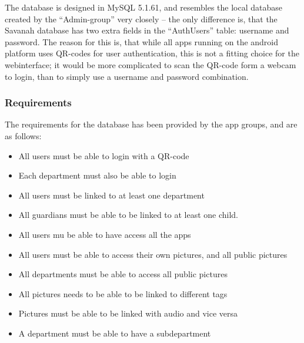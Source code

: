 The database is designed in MySQL 5.1.61, and resembles the local database created by the ``Admin-group'' very closely -- the only difference is, that the Savanah database has two extra fields in the ``AuthUsers'' table: username and password. The reason for this is, that while all apps running on the android platform uses QR-codes for user authentication, this is not a fitting choice for the webinterface; it would be more complicated to scan the QR-code form a webcam to login, than to simply use a username and password combination.

\subsubsection*{Requirements}
The requirements for the database has been provided by the app groups, and are as follows:

\begin{itemize}
	\item All users must be able to login with a QR-code
	\item Each department must also be able to login
	\item All users must be linked to at least one department
	\item All guardians must be able to be linked to at least one child.
	\item All users mu be able to have access all the apps
	\item All users must be able to access their own pictures, and all public pictures
	\item All departments must be able to access all public pictures
	\item All pictures needs to be able to be linked to different tags
	\item Pictures must be able to be linked with audio and vice versa
	\item A department must be able to have a subdepartment
\end{itemize}
